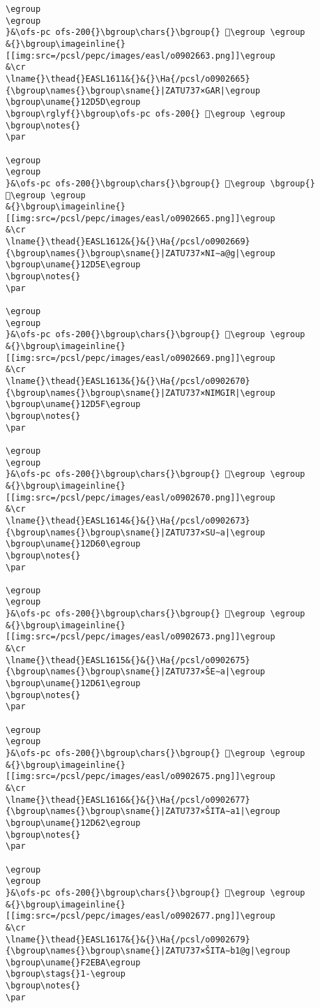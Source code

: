 \begin{verbatim}
\egroup
\egroup
}&\ofs-pc ofs-200{}\bgroup\chars{}\bgroup{} 𒵜\egroup \egroup
&{}\bgroup\imageinline{}[[img:src=/pcsl/pepc/images/easl/o0902663.png]]\egroup
&\cr
\lname{}\thead{}EASL1611&{}&{}\Ha{/pcsl/o0902665}{\bgroup\names{}\bgroup\sname{}|ZATU737×GAR|\egroup
\bgroup\uname{}12D5D\egroup
\bgroup\rglyf{}\bgroup\ofs-pc ofs-200{} 𒵝\egroup \egroup
\bgroup\notes{}
\par 

\egroup
\egroup
}&\ofs-pc ofs-200{}\bgroup\chars{}\bgroup{} 𒵝\egroup \bgroup{} 𒵦\egroup \egroup
&{}\bgroup\imageinline{}[[img:src=/pcsl/pepc/images/easl/o0902665.png]]\egroup
&\cr
\lname{}\thead{}EASL1612&{}&{}\Ha{/pcsl/o0902669}{\bgroup\names{}\bgroup\sname{}|ZATU737×NI∼a@g|\egroup
\bgroup\uname{}12D5E\egroup
\bgroup\notes{}
\par 

\egroup
\egroup
}&\ofs-pc ofs-200{}\bgroup\chars{}\bgroup{} 𒵞\egroup \egroup
&{}\bgroup\imageinline{}[[img:src=/pcsl/pepc/images/easl/o0902669.png]]\egroup
&\cr
\lname{}\thead{}EASL1613&{}&{}\Ha{/pcsl/o0902670}{\bgroup\names{}\bgroup\sname{}|ZATU737×NIMGIR|\egroup
\bgroup\uname{}12D5F\egroup
\bgroup\notes{}
\par 

\egroup
\egroup
}&\ofs-pc ofs-200{}\bgroup\chars{}\bgroup{} 𒵟\egroup \egroup
&{}\bgroup\imageinline{}[[img:src=/pcsl/pepc/images/easl/o0902670.png]]\egroup
&\cr
\lname{}\thead{}EASL1614&{}&{}\Ha{/pcsl/o0902673}{\bgroup\names{}\bgroup\sname{}|ZATU737×SU∼a|\egroup
\bgroup\uname{}12D60\egroup
\bgroup\notes{}
\par 

\egroup
\egroup
}&\ofs-pc ofs-200{}\bgroup\chars{}\bgroup{} 𒵠\egroup \egroup
&{}\bgroup\imageinline{}[[img:src=/pcsl/pepc/images/easl/o0902673.png]]\egroup
&\cr
\lname{}\thead{}EASL1615&{}&{}\Ha{/pcsl/o0902675}{\bgroup\names{}\bgroup\sname{}|ZATU737×ŠE∼a|\egroup
\bgroup\uname{}12D61\egroup
\bgroup\notes{}
\par 

\egroup
\egroup
}&\ofs-pc ofs-200{}\bgroup\chars{}\bgroup{} 𒵡\egroup \egroup
&{}\bgroup\imageinline{}[[img:src=/pcsl/pepc/images/easl/o0902675.png]]\egroup
&\cr
\lname{}\thead{}EASL1616&{}&{}\Ha{/pcsl/o0902677}{\bgroup\names{}\bgroup\sname{}|ZATU737×ŠITA∼a1|\egroup
\bgroup\uname{}12D62\egroup
\bgroup\notes{}
\par 

\egroup
\egroup
}&\ofs-pc ofs-200{}\bgroup\chars{}\bgroup{} 𒵢\egroup \egroup
&{}\bgroup\imageinline{}[[img:src=/pcsl/pepc/images/easl/o0902677.png]]\egroup
&\cr
\lname{}\thead{}EASL1617&{}&{}\Ha{/pcsl/o0902679}{\bgroup\names{}\bgroup\sname{}|ZATU737×ŠITA∼b1@g|\egroup
\bgroup\uname{}F2EBA\egroup
\bgroup\stags{}1-\egroup
\bgroup\notes{}
\par 


\end{verbatim}
